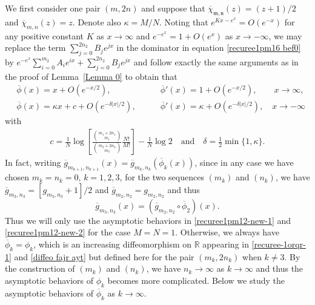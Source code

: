 \documentclass[12pt]{amsart}
\numberwithin{equation}{section}
\begin{document}
We first consider one pair $(m,2n)$ and suppose that $\overline{\chi}_{\mathfrak{m},\mathfrak{n}}(z)=(z+1)/2$ and $\overline{\chi}_{m,n}(z)=z$. Denote also $\kappa=M/N$. Noting that $e^{Kx-e^x}=O(e^{-x})$ for any positive constant $K$ as $x\to\infty$ and $e^{-e^x}=1+O(e^{x})$ as $x\to-\infty$, we may replace the term $\sum_{j=0}^{2n_2}B_je^{jx}$ in the dominator in equation \eqref{recuree1pm16  bef0} by $e^{-e^x}\sum_{i=0}^{m_2}A_ie^{ix}+\sum_{j=0}^{2n_2}B_je^{jx}$ and follow exactly the same arguments as in the proof of Lemma~\ref{Lemma 0} to obtain that
\begin{eqnarray}
&\overline{\phi}(x)=x+O(e^{-x/2}),        \quad\quad\quad\quad\quad &\overline{\phi}'(x)=1+O(e^{-x/2}), \quad\quad x\to \infty,  \label{recuree1pm12-new-1}\\
&\overline{\phi}(x)=\kappa x+c+O(e^{-\delta|x|/2}),    \quad\quad &\overline{\phi}'(x)=\kappa+O(e^{-\delta|x|/2}),  \quad x\to -\infty            \label{recuree1pm12-new-2}
\end{eqnarray}
with
\begin{equation*}%
\begin{split}
c=\frac{1}{N}\log \left[\frac{\binom{m_1+2n_1}{m_1}}{\binom{m_2+2n_2}{m_2}}\frac{N!}{M!}\right] -\frac{1}{N}\log 2 \quad \text{and} \quad \delta=\frac{1}{2}\min\{1,\kappa\}.
\end{split}
\end{equation*}
In fact, writing $\overline{g}_{m_{k+1},n_{k+1}}(x)=\overline{g}_{m_k,n_k}(\overline{\phi}_k(x))$, since in any case we have chosen $m_k=n_k=0$, $k=1,2,3$, for the two sequences $(m_k)$ and $(n_k)$, we have $\overline{g}_{m_{3},n_{3}}=[g_{m_3,n_3}+1]/2$ and $\overline{g}_{m_2,n_2}=g_{m_2,n_2}$ and thus
\begin{equation}\label{diffeo-s-2}
\overline{g}_{m_3,n_3}(x)=(\overline{g}_{m_2,n_2}\circ\overline{\phi}_{2})(x).
\end{equation}
Thus we will only use the asymptotic behaviors in \eqref{recuree1pm12-new-1} and \eqref{recuree1pm12-new-2} for the case $M=N=1$. Otherwise, we always have $\overline{\phi}_k=\phi_k$, which is an increasing diffeomorphism on $\mathbb{R}$ appearing in \eqref{recuree-1orqr-1} and \eqref{diffeo  fajr  ayt} but defined here for the pair $(m_k,2n_k)$ when $k\not=3$. By the construction of $(m_k)$ and $(n_k)$, we have $n_k\to\infty$ as $k\to\infty$ and thus the asymptotic behaviors of $\phi_k$ becomes more complicated. Below we study the asymptotic behaviors of $\overline{\phi}_k$ as $k\to\infty$.
\end{document}
